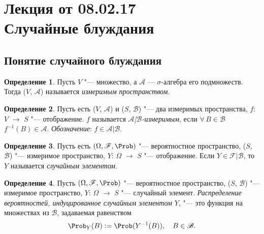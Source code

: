 \documentclass[a4paper]{article}
\theoremstyle{plain}
\theoremstyle{definition}
\newtheorem{defn}{Определение}[section]
\theoremstyle{remark}
\begin{document}
\tableofcontents

\section[Лекция от 08.02.17. Случайные блуждания]{Лекция от 08.02.17\\ {\large Случайные блуждания}}

\subsection{Понятие случайного блуждания}

\begin{defn}
  Пусть $V$ "--- множество, а $\mathscr{A}$ — $\sigma$-алгебра его подмножеств. Тогда ($V$, $\mathscr{A}$) называется \emph{измеримым пространством}.
\end{defn}

\begin{defn}
  Пусть есть ($V$, $\mathscr{A}$) и ($S$, $\mathscr{B}$) "--- два измеримых пространства, $f$: $V$ $\rightarrow$ $S$ "--- отображение. $f$ называется \emph{$\mathscr{A}$|$\mathscr{B}$-измеримым}, если $\forall\, B \in\mathscr{B}$ $f^{-1}(B)\in\mathscr{A}$. \emph{Обозначение}: $f\in\mathscr{A}|\mathscr{B}$.
\end{defn}

\begin{defn}
  Пусть есть $(\Omega, \mathscr{F}, \Prob)$ "--- вероятностное пространство, \linebreak($S$, $\mathscr{B}$) "--- измеримое пространство, $Y$: $\Omega$ $\rightarrow$ $S$ "--- отображение. Если $Y\in\mathscr{F}|\mathscr{B}$, то $Y$ называется \emph{случайным элементом}.
\end{defn}

\begin{defn}
  Пусть $(\Omega, \mathscr{F}, \Prob)$ "--- вероятностное пространство, \linebreak($S$, $\mathscr{B}$) "--- измеримое пространство, $Y$: $\Omega$ $\rightarrow$ $S$ "--- случайный элемент. \emph{Распределение вероятностей, индуцированное случайным элементом $Y$}, "--- это функция на множествах из $\mathscr{B}$, задаваемая равенством
  \begin{equation*}
    \Prob_{Y}(B):= \Prob(Y^{-1}(B)), \quad B\in\mathscr{B}.
  \end{equation*}
\end{defn}
\end{document}
